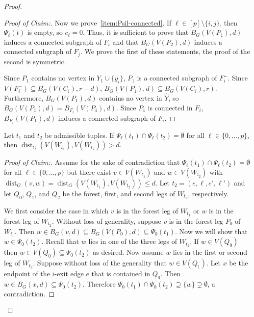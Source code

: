\documentclass{patmorin}
\newenvironment{clmproof}{\begin{proof}[Proof of Claim:]\renewcommand{\qedsymbol}{\rule{1ex}{1ex}}}{\end{proof}}
\DeclareMathOperator{\dist}{dist}
\begin{document}
\begin{proof}
\begin{clmproof}
    Now we prove~\cref{item:Psil-connected}. If $\ell\in [p]\setminus\{i,j\}$, then $\Psi_\ell(t)$ is empty, so $c_\ell=0$. Thus, it is sufficient to prove that $B_G(V(P_1), d)$ induces a connected subgraph of $F_i$ and that $B_G(V(P_2),d)$ induces a connected subgraph of $F_j$.  We prove the first of these statements, the proof of the second is symmetric.

    Since $P_1$ contains no vertex in $Y_1\cup\{y_i\}$, $P_1$ is a connected subgraph of $F_i^-$.  Since $V(F^-_i)\subseteq B_G(V(C_i),r-d)$, $B_G(V(P_1),d)\subseteq B_G(V(C_i),r)$.  Furthermore, $B_G(V(P_1),d)$ contains no vertex in $\widehat{Y}$, so $B_G(V(P_1),d)=B_{F_i}(V(P_1),d)$. Since $P_1$ is connected in $F_i$, $B_{F_i}(V(P_1),d)$ induces a connected subgraph of $F_i$.
  \end{clmproof}

  \begin{clm}\label{w_distance}
    Let $t_1$ and $t_2$ be admissible tuples. If $\Psi_\ell(t_1)\cap \Psi_\ell(t_2)=\emptyset$ for all $\ell\in\{0,\ldots,p\}$, then $\dist_G(V(W_{t_1}),V(W_{t_2}))> d$.
  \end{clm}

  \begin{clmproof}
    Assume for the sake of contradiction that $\Psi_\ell(t_1)\cap\Psi_\ell(t_2)=\emptyset$ for all $\ell\in\{0,\ldots,p\}$ but there exist $v\in V(W_{t_1})$ and $w\in V(W_{t_2})$ with $\dist_G(v,w)=\dist_G(V(W_{t_1}),V(W_{t_2})) \le d$.  Let $t_2=(e,\ell,e',\ell')$ and let $Q_0$, $Q_1$, and $Q_2$ be the forest, first, and second legs of $W_{t_2}$, respectively.

    We first consider the case in which $v$ is in the forest leg of $W_{t_1}$ or $w$ is in the forest leg of $W_{t_2}$.   Without loss of generality, suppose $v$ is in the forest leg $P_0$ of $W_{t_1}$. Then $w\in B_G(v,d)\subseteq B_G(V(P_0),d)\subseteq\Psi_0(t_1)$.  Now we will show that $w\in \Psi_0(t_2)$.   Recall that $w$ lies in one of the three legs of $W_{t_2}$. If $w\in V(Q_0)$ then $w\in V(Q_0)\subseteq \Psi_0(t_2)$ as desired. Now assume $w$ lies in the first or second leg of $W_{t_2}$. Suppose without loss of the generality that $w\in V(Q_1)$. Let $x$ be the endpoint of the $i$-exit edge $e$ that is contained in $Q_0$. Then $w\in B_G(x,d)\subseteq\Psi_0(t_2)$. Therefore $\Psi_0(t_1)\cap\Psi_0(t_2)\supseteq\{w\}\supsetneq\emptyset$, a contradiction.


\end{clmproof}
\end{proof}
\end{document}
